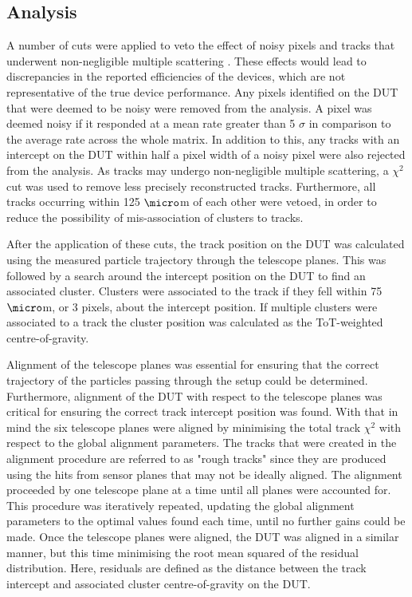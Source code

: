 \subsection{Analysis}
A number of cuts were applied to veto the effect of noisy pixels and tracks that underwent non-negligible multiple scattering \cite{Tehrani:2016ogb}.  These effects would lead to discrepancies in the reported efficiencies of the devices, which are not representative of the true device performance.  Any pixels identified on the DUT that were deemed to be noisy were removed from the analysis.  A pixel was deemed noisy if it responded at a mean rate greater than 5 $\sigma$ in comparison to the average rate across the whole matrix.  In addition to this, any tracks with an intercept on the DUT within half a pixel width of a noisy pixel were also rejected from the analysis.  As tracks may undergo non-negligible multiple scattering, a $\chi^{2}$ cut was used to remove less precisely reconstructed tracks.  Furthermore, all tracks occurring within 125 $\micro$m of each other were vetoed, in order to reduce the possibility of mis-association of clusters to tracks. 

After the application of these cuts, the track position on the DUT was calculated using the measured particle trajectory through the telescope planes.  This was followed by a search around the intercept position on the DUT to find an associated cluster.  Clusters were associated to the track if they fell within 75 $\micro$m, or 3 pixels, about the intercept position.  If multiple clusters were associated to a track the cluster position was calculated as the ToT-weighted centre-of-gravity.  

Alignment of the telescope planes was essential for ensuring that the correct trajectory of the particles passing through the setup could be determined.  Furthermore, alignment of the DUT with respect to the telescope planes was critical for ensuring the correct track intercept position was found.  With that in mind the six telescope planes were aligned by minimising the total track $\chi^{2}$ with respect to the global alignment parameters.  The tracks that were created in the alignment procedure are referred to as "rough tracks" since they are produced using the hits from sensor planes that may not be ideally aligned.  The alignment proceeded by one telescope plane at a time until all planes were accounted for.  This procedure was iteratively repeated, updating the global alignment parameters to the optimal values found each time, until no further gains could be made.  Once the telescope planes were aligned, the DUT was aligned in a similar manner, but this time minimising the root mean squared of the residual distribution.  Here, residuals are defined as the distance between the track intercept and associated cluster centre-of-gravity on the DUT.  

